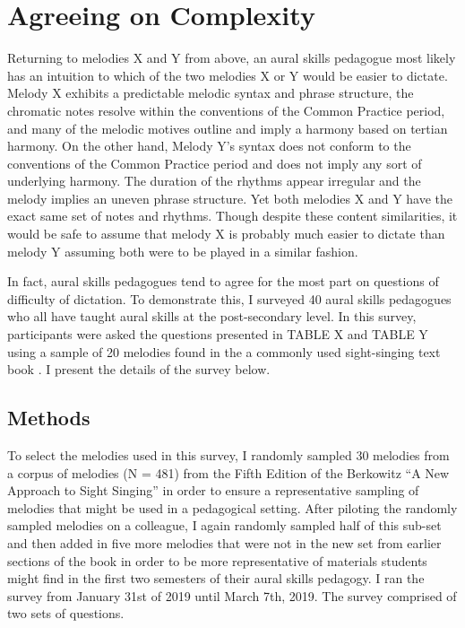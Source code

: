 \documentclass[]{book}
\begin{document}
\hypertarget{agreeing-on-complexity}{%
\section{Agreeing on Complexity}\label{agreeing-on-complexity}}

Returning to melodies X and Y from above, an aural skills pedagogue most likely has an intuition to which of the two melodies X or Y would be easier to dictate.
Melody X exhibits a predictable melodic syntax and phrase structure, the chromatic notes resolve within the conventions of the Common Practice period, and many of the melodic motives outline and imply a harmony based on tertian harmony.
On the other hand, Melody Y's syntax does not conform to the conventions of the Common Practice period and does not imply any sort of underlying harmony.
The duration of the rhythms appear irregular and the melody implies an uneven phrase structure.
Yet both melodies X and Y have the exact same set of notes and rhythms.
Though despite these content similarities, it would be safe to assume that melody X is probably much easier to dictate than melody Y assuming both were to be played in a similar fashion.

In fact, aural skills pedagogues tend to agree for the most part on questions of difficulty of dictation.
To demonstrate this, I surveyed 40 aural skills pedagogues who all have taught aural skills at the post-secondary level.
In this survey, participants were asked the questions presented in TABLE X and TABLE Y using a sample of 20 melodies found in the a commonly used sight-singing text book \citep{berkowitzNewApproachSight2011}.
I present the details of the survey below.

\hypertarget{methods}{%
\subsection{Methods}\label{methods}}

To select the melodies used in this survey, I randomly sampled 30 melodies from a corpus of melodies (N = 481) from the Fifth Edition of the Berkowitz ``A New Approach to Sight Singing'' \citep{berkowitzNewApproachSight2011} in order to ensure a representative sampling of melodies that might be used in a pedagogical setting.
After piloting the randomly sampled melodies on a colleague, I again randomly sampled half of this sub-set and then added in five more melodies that were not in the new set from earlier sections of the book in order to be more representative of materials students might find in the first two semesters of their aural skills pedagogy.
I ran the survey from January 31st of 2019 until March 7th, 2019.
The survey comprised of two sets of questions.
\end{document}
